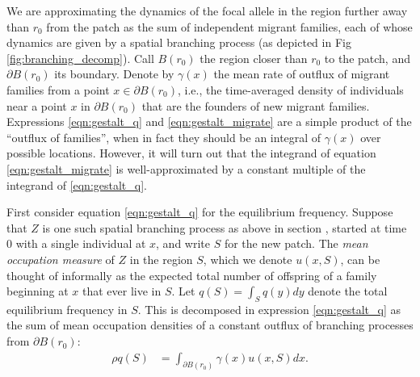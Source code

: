\documentclass[10pt,letterpaper]{article}
\newcommand{\E}{\mathbb{E}}
\newcommand{\secref}[1]{{\emph{\nameref{#1}}}}
\begin{document}
We are approximating the dynamics of the focal allele in the region further away than $r_0$ from the patch
as the sum of independent migrant families, each of whose dynamics are
given by a spatial branching process (as depicted in Fig \ref{fig:branching_decomp}).
Call $B(r_0)$ the region closer than $r_0$ to the patch, and $\partial B(r_0)$ its boundary.
Denote by $\gamma(x)$ the mean rate of outflux of migrant families from a point $x \in \partial B(r_0)$,
i.e., the time-averaged density of individuals near a point $x$ in $\partial B(r_0)$ 
that are the founders of new migrant families.
Expressions \eqref{eqn:gestalt_q} and \eqref{eqn:gestalt_migrate} are a simple product of the ``outflux of families'',
when in fact they should be an integral of $\gamma(x)$ over possible locations. 
However,
it will turn out that the integrand of equation \eqref{eqn:gestalt_migrate} 
is well-approximated by a constant multiple of the integrand of \eqref{eqn:gestalt_q}.

First consider equation \eqref{eqn:gestalt_q} for the equilibrium frequency.
Suppose that $Z$ is one such spatial branching process as above in section \secref{ss:migrant_math}, 
started at time 0 with a single individual at $x$,
and write $S$ for the new patch.
The \emph{mean occupation measure} of $Z$ in the region $S$,
which we denote $u(x,S)$,
can be thought of informally 
as the expected total number of offspring of a family beginning at $x$ that ever live in $S$.
Let $q(S) = \int_S q(y) dy$ denote the total equilibrium frequency in $S$.
This is decomposed in expression \eqref{eqn:gestalt_q} 
as the sum of mean occupation densities of a constant outflux of branching processes
from $\partial B(r_0)$:
\begin{align} \label{eqn:occupation_integral}
    \rho q(S) &= \int_{\partial B(r_0)} \gamma(x) u(x,S) dx  . 
\end{align}
\end{document}
